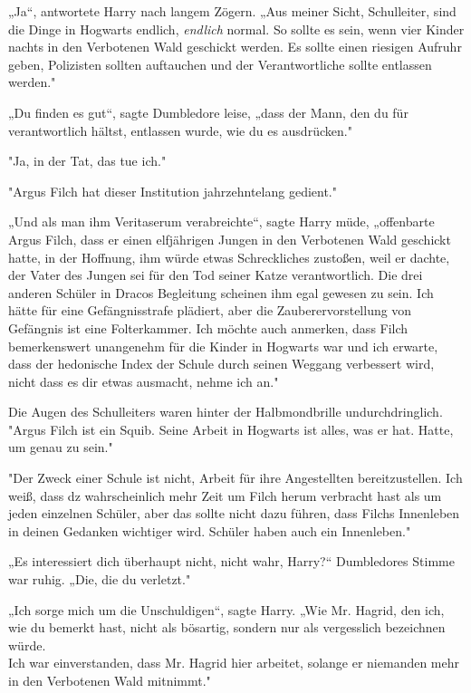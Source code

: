 {„Ja“, antwortete Harry nach langem Zögern. „Aus meiner Sicht, Schulleiter, sind die Dinge in Hogwarts endlich, \emph{endlich} normal. So sollte es sein, wenn vier Kinder nachts in den Verbotenen Wald geschickt werden. Es sollte einen riesigen Aufruhr geben, Polizisten sollten auftauchen und der Verantwortliche sollte entlassen werden."

„Du finden es gut“, sagte Dumbledore leise, „dass der Mann, den du für verantwortlich hältst, entlassen wurde, wie du es ausdrücken."

"Ja, in der Tat, das tue ich."

"Argus Filch hat dieser Institution jahrzehntelang gedient."

„Und als man ihm Veritaserum verabreichte“, sagte Harry müde, „offenbarte Argus Filch, dass er einen elfjährigen Jungen in den Verbotenen Wald geschickt hatte, in der Hoffnung, ihm würde etwas Schreckliches zustoßen, weil er dachte, der Vater des Jungen sei für den Tod seiner Katze verantwortlich. Die drei anderen Schüler in Dracos Begleitung scheinen ihm egal gewesen zu sein. Ich hätte für eine Gefängnisstrafe plädiert, aber die Zauberervorstellung von Gefängnis ist eine Folterkammer. Ich möchte auch anmerken, dass Filch bemerkenswert unangenehm für die Kinder in Hogwarts war und ich erwarte, dass der hedonische Index der Schule durch seinen Weggang verbessert wird, nicht dass es dir etwas ausmacht, nehme ich an."

Die Augen des Schulleiters waren hinter der Halbmondbrille undurchdringlich.\\ "Argus Filch ist ein Squib. Seine Arbeit in Hogwarts ist alles, was er hat. Hatte, um genau zu sein."

"Der Zweck einer Schule ist nicht, Arbeit für ihre Angestellten bereitzustellen. Ich weiß, dass dz wahrscheinlich mehr Zeit um Filch herum verbracht hast als um jeden einzelnen Schüler, aber das sollte nicht dazu führen, dass Filchs Innenleben in deinen Gedanken wichtiger wird. Schüler haben auch ein Innenleben."

„Es interessiert dich überhaupt nicht, nicht wahr, Harry?“ Dumbledores Stimme war ruhig. „Die, die du verletzt."

„Ich sorge mich um die Unschuldigen“, sagte Harry. „Wie Mr. Hagrid, den ich, wie du bemerkt hast, nicht als bösartig, sondern nur als vergesslich bezeichnen würde.\\ Ich war einverstanden, dass Mr. Hagrid hier arbeitet, solange er niemanden mehr in den Verbotenen Wald mitnimmt."

}
